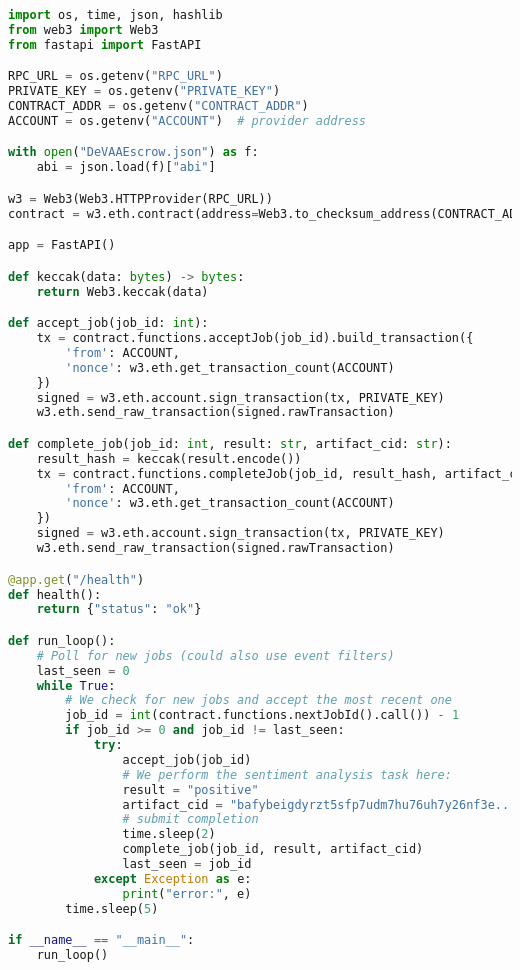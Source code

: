 \begin{lstlisting}[language=Python,caption={agent_runner.py}]
import os, time, json, hashlib
from web3 import Web3
from fastapi import FastAPI

RPC_URL = os.getenv("RPC_URL")
PRIVATE_KEY = os.getenv("PRIVATE_KEY")
CONTRACT_ADDR = os.getenv("CONTRACT_ADDR")
ACCOUNT = os.getenv("ACCOUNT")  # provider address

with open("DeVAAEscrow.json") as f:
    abi = json.load(f)["abi"]

w3 = Web3(Web3.HTTPProvider(RPC_URL))
contract = w3.eth.contract(address=Web3.to_checksum_address(CONTRACT_ADDR), abi=abi)

app = FastAPI()

def keccak(data: bytes) -> bytes:
    return Web3.keccak(data)

def accept_job(job_id: int):
    tx = contract.functions.acceptJob(job_id).build_transaction({
        'from': ACCOUNT,
        'nonce': w3.eth.get_transaction_count(ACCOUNT)
    })
    signed = w3.eth.account.sign_transaction(tx, PRIVATE_KEY)
    w3.eth.send_raw_transaction(signed.rawTransaction)

def complete_job(job_id: int, result: str, artifact_cid: str):
    result_hash = keccak(result.encode())
    tx = contract.functions.completeJob(job_id, result_hash, artifact_cid).build_transaction({
        'from': ACCOUNT,
        'nonce': w3.eth.get_transaction_count(ACCOUNT)
    })
    signed = w3.eth.account.sign_transaction(tx, PRIVATE_KEY)
    w3.eth.send_raw_transaction(signed.rawTransaction)

@app.get("/health")
def health():
    return {"status": "ok"}

def run_loop():
    # Poll for new jobs (could also use event filters)
    last_seen = 0
    while True:
        # We check for new jobs and accept the most recent one
        job_id = int(contract.functions.nextJobId().call()) - 1
        if job_id >= 0 and job_id != last_seen:
            try:
                accept_job(job_id)
                # We perform the sentiment analysis task here:
                result = "positive"
                artifact_cid = "bafybeigdyrzt5sfp7udm7hu76uh7y26nf3e..."  # We store results on IPFS
                # submit completion
                time.sleep(2)
                complete_job(job_id, result, artifact_cid)
                last_seen = job_id
            except Exception as e:
                print("error:", e)
        time.sleep(5)

if __name__ == "__main__":
    run_loop()
\end{lstlisting}


